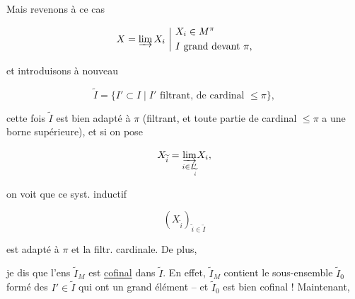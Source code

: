 
Mais revenons à ce cas

\[
 X=\varinjlim X_i\ \bigg|\ \begin{aligned}&X_i\in M^\pi\\&I\text{ grand devant }\pi,\end{aligned}
\]

et introduisons à nouveau

\[
 \widetilde I=\{I'\subset I\mid I'\text{ filtrant, de cardinal }\leq\pi\},
\]

 cette fois $\widetilde I$ est  bien adapté à $\pi$ (filtrant, et toute partie  de cardinal $\leq\pi$ a une borne supérieure), et si on pose

\[
 X_{\widetilde i}=\underset{i\in I'_{\widetilde i}}{\varinjlim} X_i,
\]

on voit que ce syst. inductif

\[
 (X_{\widetilde i})_{\widetilde i\in\widetilde I}
\]

est  adapté à $\pi$ et la filtr. cardinale. De plus, 


 je dis que l'ens $\widetilde I_M$ est \uline{cofinal} dans $\widetilde I$. En effet,  $\widetilde I_M$ contient le sous-ensemble $\widetilde I_0$ formé des $I'\in\widetilde I$ qui ont un  grand élément -- et $\widetilde I_0$ est bien cofinal ! Maintenant,  

